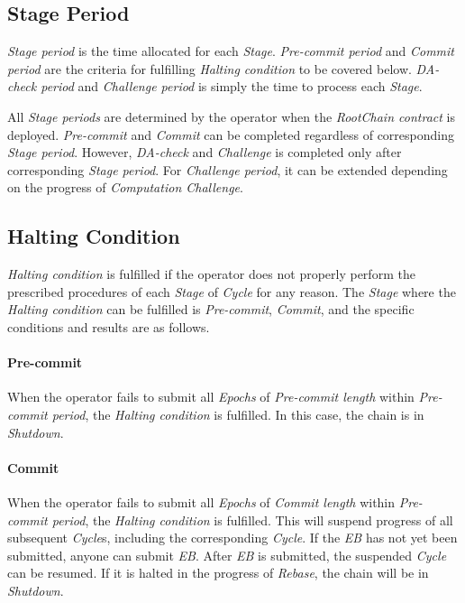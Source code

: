 \documentclass[letterpaper, 11pt]{article}
\begin{document}
\subsection{Stage Period}
\begin{CJK}{UTF8}{mj}
\emph{Stage period} is the time allocated for each \emph{Stage}. \emph{Pre-commit period} and \emph{Commit period} are the criteria for fulfilling \emph{Halting condition} to be covered below. \emph{DA-check period} and \emph{Challenge period} is simply the time to process each \emph{Stage}.

All \emph{Stage periods} are determined by the operator when the \emph{RootChain contract} is deployed. \emph{Pre-commit} and \emph{Commit} can be completed regardless of corresponding \emph{Stage period}. However, \emph{DA-check} and \emph{Challenge} is completed only after corresponding \emph{Stage period}. For \emph{Challenge period}, it can be extended depending on the progress of \emph{Computation Challenge}.
\end{CJK}

\subsection{Halting Condition}
\begin{CJK}{UTF8}{mj}
\emph{Halting condition} is fulfilled if the operator does not properly perform the prescribed procedures of each \emph{Stage} of \emph{Cycle} for any reason. The \emph{Stage} where the \emph{Halting condition} can be fulfilled is \emph{Pre-commit}, \emph{Commit}, and the specific conditions and results are as follows.
\end{CJK}

\paragraph{Pre-commit}
\begin{CJK}{UTF8}{mj}
When the operator fails to submit all \emph{Epochs} of \emph{Pre-commit length} within \emph{Pre-commit period}, the \emph{Halting condition} is fulfilled. In this case, the chain is in \emph{Shutdown}.
\end{CJK}

\paragraph{Commit}
\begin{CJK}{UTF8}{mj}
When the operator fails to submit all \emph{Epochs} of \emph{Commit length} within \emph{Pre-commit period}, the \emph{Halting condition} is fulfilled. This will suspend progress of all subsequent \emph{Cycle}s, including the corresponding \emph{Cycle}. If the \emph{EB} has not yet been submitted, anyone can submit \emph{EB}. After \emph{EB} is submitted, the suspended \emph{Cycle} can be resumed. If it is halted in the progress of \emph{Rebase}, the chain will be in \emph{Shutdown}.
\end{CJK}
\end{document}
